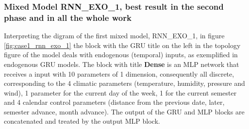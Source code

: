         \subsubsection{Mixed Model RNN\_EXO\_1, best result in the second phase and in all the whole work}
            Interpreting the digram of the first mixed model, RNN\_EXO\_1, in figure \ref{fig:case1_rnn_exo_1} the block with the GRU title on the left in the topology figure of the model deals with endogenous (temporal) inputs, as exemplified in endogenous GRU models. The block with title \textbf{Dense} is an MLP network that receives a input with 10 parameters of 1 dimension, consequently all discrete, corresponding to the 4 climatic parameters (temperature, humidity, pressure and wind), 1 parameter for the current day of the week, 1 for the current semester and 4 calendar control parameters (distance from the previous date, later, semester advance, month advance). The output of the GRU and MLP blocks are concatenated and treated by the output MLP block.
            \begin{figure}[H]
            \end{figure}
